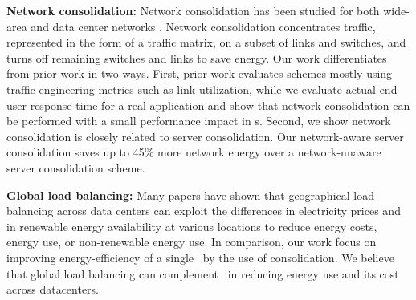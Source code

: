 
\textbf{Network consolidation:} Network  consolidation has been studied for both wide-area and data center networks \cite{response, elasticTree, greenTE, Chiaraviglio, Andrews}. Network consolidation concentrates traffic, represented in the form of a traffic matrix, on a subset of links and switches, and turns off remaining switches and links to save energy. Our work differentiates from prior work in two ways. First, prior work evaluates schemes mostly using traffic engineering metrics such as link utilization, while we evaluate actual end user response time for a real application and show that network consolidation can be performed with a small performance impact in \cdc s. Second, we show network consolidation is closely related to server consolidation. Our network-aware server consolidation saves up to 45\% more network energy over a network-unaware server consolidation scheme.
%
%
%
%
%
%
%

\textbf{Global load balancing:} Many papers \cite{Liu11,qureshi2009cutting,Gao12,Rao10}  have shown that geographical load-balancing across data centers can exploit the differences in electricity prices and in renewable energy availability at various locations to reduce energy costs, energy use, or non-renewable energy use.  In comparison, our work focus on improving energy-efficiency of a single \cdc\ by the use of consolidation. We believe that global load balancing can complement \shrink\ in reducing energy use and its cost across datacenters.

